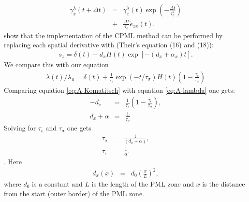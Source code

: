 \documentclass[11pt]{article}
\begin{document}
\begin{eqnarray*}
\gamma^{\lambda}_x(t+\Delta t) 
   & = & \gamma^{\lambda}_x (t)\exp(-\frac{\Delta t}{\tau^{\lambda}_{\sigma}}) \\
   & + & \frac{\Delta t}{\tau_{0}}\dot{e}_{xx}(t).
\end{eqnarray*}
\cite{Komatitsch2007} show that the implementation of the CPML method can
be performed by replacing each spatial derivative with
(Their's equation (16) and (18)):
\begin{eqnarray}
  s_x = \delta(t) - d_x H(t) \exp \left[-(d_x+\alpha_x)t\right].
                                          \label{eq:A-Komatitsch} 
\end{eqnarray}
We compare this with our equation
\begin{eqnarray}
  \lambda(t)/\lambda_u = \delta(t) + \frac{1}{\tau_{\epsilon}}
                         \exp(-t/\tau_{\sigma}) H(t)
                         \left(1-\frac{\tau_{\epsilon}}{\tau_{\sigma}}\right)
                                           \label{eq:A-lambda}
\end{eqnarray}
Comparing equation \eqref{eq:A-Komatitsch} with equation
\eqref{eq:A-lambda} one gets:
\begin{eqnarray}
-d_x         & = & \frac{1}{\tau_{\epsilon}}\left(1-\frac{\tau_{\epsilon}}
                                            {\tau_{\sigma}}\right), \\
d_x +\alpha & = & \frac{1}{\tau_{\sigma}}
\end{eqnarray}
Solving for $\tau_{\epsilon}$ and $\tau_{\sigma}$ one gets
\begin{eqnarray}
  \tau_{\sigma}   & = & \frac{1}{(d_x+\alpha)},\\
  \tau_{\epsilon} & = & \frac{1}{\alpha}.
\end{eqnarray}.
Here 
\begin{eqnarray}
 d_x (x) & = & d_0 \left(\frac{x}{L}\right)^2,
\end{eqnarray}
where $d_0$ is a constant and $L$ is the length of
the PML zone and $x$ is the distance from the start (outer border)
of the PML zone.


\end{document}
